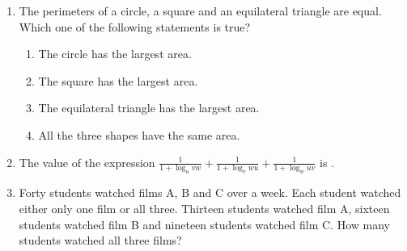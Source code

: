 \documentclass[journal,12pt,onecolumn]{IEEEtran}
\theoremstyle{remark}
\begin{document}
\begin{enumerate}
    \item The perimeters of a circle, a square and an equilateral triangle are equal. Which one of the following statements is true?
    
    \hfill{}
    \begin{enumerate}
        \item The circle has the largest area.
        \item The square has the largest area.
        \item The equilateral triangle has the largest area.
        \item All the three shapes have the same area.
    \end{enumerate}

    \item The value of the expression $\frac{1}{1+\log_u vw} + \frac{1}{1+\log_v wu} + \frac{1}{1+\log_w uv}$ is \underline{\hspace{2cm}}.
    
    \hfill{}
    \begin{enumerate}
    \end{enumerate}

   \item Forty students watched films A, B and C over a week. Each student watched either only one film or all three. Thirteen students watched film A, sixteen students watched film B and nineteen students watched film C. How many students watched all three films? \nolinebreak
   
   \hfill\mbox{}
\begin{enumerate}
\end{enumerate}
\end{enumerate}
\end{document}
